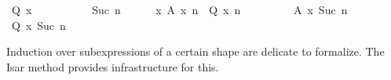 \begin{isabellebody}
\ {}Q\ x\ {}{}\ \isamarkupfalse%
\isanewline
\ \ \isamarkupfalse%
\isanewline
\ \ \ \ \isamarkupfalse%
\ {}Suc\ n{}\isanewline
\ \ \ \ \isamarkupfalse%
\ {}{}x{}\ A\ x\ n\ {}\ Q\ x\ n{}\ \ %
\isanewline
\ \ \ \ \ \ \ {}A\ x\ {}Suc\ n{}{}\ \isamarkupfalse%
\ {}Q\ x\ {}Suc\ n{}{}\ \isamarkupfalse%
\isanewline
\ \ \isamarkupfalse%
%
\endisatagproof
{\isafoldproof}%
%
\isadelimproof
\isanewline
%
\endisadelimproof
{}\isamarkupfalse%
%
\isamarkuptrue%
%
\begin{isamarkuptext}%
Induction over subexpressions of a certain shape are delicate
  to formalize.  The Isar \hyperlink{method.induct}{\mbox{}} method provides
  infrastructure for this.


\end{isamarkuptext}
\end{isabellebody}
